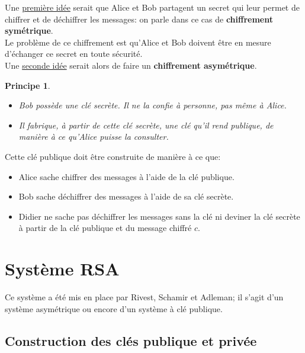 \documentclass[12pt]{report}
\newtheorem*{prin}{Principe}
\begin{document}
Une \underline{première idée} serait que Alice et Bob partagent un secret qui leur permet de chiffrer et de déchiffrer les messages: on parle dans ce cas de \textbf{chiffrement symétrique}.\\

Le problème de ce chiffrement est qu'Alice et Bob doivent être en mesure d'échanger ce secret en toute sécurité.\\

Une \underline{seconde idée} serait alors de faire un \textbf{chiffrement asymétrique}.

\begin{prin}\
\begin{itemize}
\item[•] Bob possède une clé secrète. Il ne la confie à personne, pas même à Alice.
\item[•] Il fabrique, à partir de cette clé secrète, une clé qu'il rend publique, de manière à ce qu'Alice puisse la consulter.
\end{itemize}
\end{prin}

Cette clé publique doit être construite de manière à ce que:
\begin{itemize}
\item[•] Alice sache chiffrer des messages à l'aide de la clé publique.
\item[•] Bob sache déchiffrer des messages à l'aide de sa clé secrète.
\item[•] Didier ne sache pas déchiffrer les messages sans la clé ni deviner la clé secrète à partir de la clé publique et du message chiffré $c$. 
\end{itemize}

\section{Système RSA}

Ce système a été mis en place par Rivest, Schamir et Adleman; il s'agit d'un système asymétrique ou encore d'un système à clé publique.


\subsection{Construction des clés publique et privée}
\end{document}
